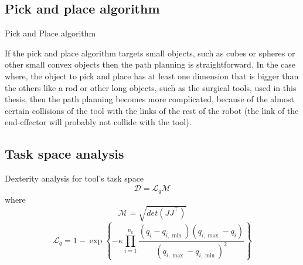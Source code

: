 \subsection{Pick and place algorithm}

\begin{algorithm}[H]
\SetAlgoLined
{}
\caption{Pick and Place algorithm}
\end{algorithm}

If the pick and place algorithm targets small objects, such as cubes or spheres or other small convex objects then the path planning is straightforward. In the case where, the object to pick and place has at least one 
dimension that is bigger than the others like a rod or other long objects, such as the surgical tools, used in this thesis, then the path planning becomes more complicated, because of the almost certain collisions 
of the tool with the links of the rest of the robot (the link of the end-effector will probably not collide with the tool).


\subsection{Task space analysis}

Dexterity analysis for tool's task space
\begin{equation}
\mathcal{D} = \mathcal{L}_q \mathcal{M}
\end{equation}
where
\begin{equation}
\mathcal{M} = \sqrt{det(J J^\top)}
\end{equation}
\begin{equation}
\label{joint-limit-measure}
\mathcal{L}_{q}=1-\exp\left\{-\kappa\prod_{i=1}^{n_{k}}\frac{(q_{ {i}}-q_{i,\min})(q_{i,\max}-q_{i})}{(q_{i,\max}-q_{i,\min})^{2}}\right\}
\end{equation}

